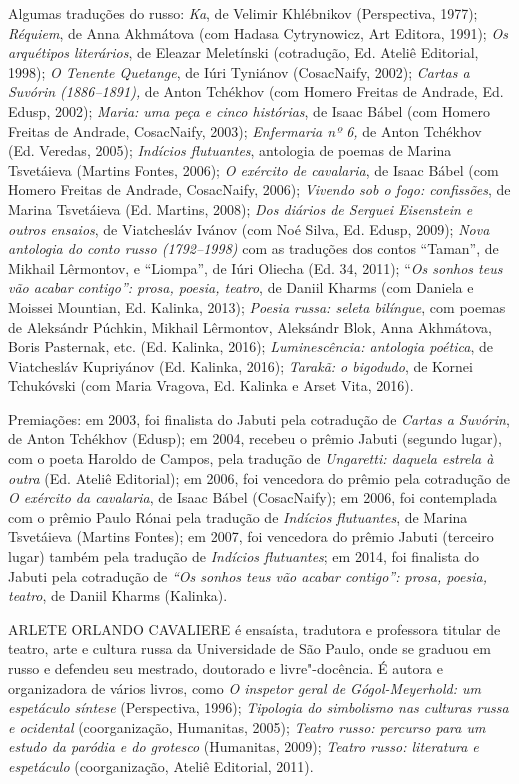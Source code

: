 Algumas traduções do russo: \emph{Ka}, de Velimir Khlébnikov
(Perspectiva, 1977); \emph{Réquiem}, de Anna Akhmátova (com Hadasa
Cytrynowicz, Art Editora, 1991); \emph{Os arquétipos literários}, de
Eleazar Meletínski (cotradução, Ed. Ateliê Editorial, 1998); \emph{O
Tenente Quetange}, de Iúri Tyniánov (CosacNaify, 2002); \emph{Cartas a
Suvórin (1886--1891),} de Anton Tchékhov (com Homero Freitas de Andrade,
Ed. Edusp, 2002); \emph{Maria: uma peça e cinco histórias}, de Isaac
Bábel (com Homero Freitas de Andrade, CosacNaify, 2003);
\emph{Enfermaria nº 6,} de Anton Tchékhov (Ed. Veredas, 2005);
\emph{Indícios flutuantes}, antologia de poemas de Marina Tsvetáieva
(Martins Fontes, 2006); \emph{O exército de cavalaria}, de Isaac Bábel
(com Homero Freitas de Andrade, CosacNaify, 2006); \emph{Vivendo sob o
fogo: confissões}, de Marina Tsvetáieva (Ed. Martins, 2008); \emph{Dos
diários de Serguei Eisenstein e outros ensaios}, de Viatchesláv Ivánov
(com Noé Silva, Ed. Edusp, 2009); \emph{Nova antologia do conto russo
(1792--1998)} com as traduções dos contos ``Taman'', de Mikhail
Lêrmontov, e ``Liompa'', de Iúri Oliecha (Ed. 34, 2011); ``\emph{Os
sonhos teus vão acabar contigo'': prosa, poesia, teatro}, de Daniil
Kharms (com Daniela e Moissei Mountian, Ed. Kalinka, 2013); \emph{Poesia
russa: seleta bilíngue}, com poemas de Aleksándr Púchkin, Mikhail
Lêrmontov, Aleksándr Blok, Anna Akhmátova, Boris Pasternak, etc. (Ed.
Kalinka, 2016); \emph{Luminescência: antologia poética}, de Viatchesláv
Kupriyánov (Ed. Kalinka, 2016); \emph{Tarakã: o bigodudo}, de Kornei
Tchukóvski (com Maria Vragova, Ed. Kalinka e Arset Vita, 2016).

Premiações: em 2003, foi finalista do Jabuti pela cotradução de
\emph{Cartas a Suvórin}, de Anton Tchékhov (Edusp); em 2004, recebeu o
prêmio Jabuti (segundo lugar), com o poeta Haroldo de Campos, pela
tradução de \emph{Ungaretti: daquela estrela à outra} (Ed. Ateliê
Editorial); em 2006, foi vencedora do prêmio \scalebox{0.8}{APCA} pela cotradução de
\emph{O exército da cavalaria}, de Isaac Bábel (CosacNaify); em 2006,
foi contemplada com o prêmio Paulo Rónai pela tradução de \emph{Indícios
flutuantes}, de Marina Tsvetáieva (Martins Fontes); em 2007, foi
vencedora do prêmio Jabuti (terceiro lugar) também pela tradução de
\emph{Indícios flutuantes}; em 2014, foi finalista do Jabuti pela
cotradução de \emph{``Os sonhos teus vão acabar contigo'': prosa,
poesia, teatro}, de Daniil Kharms (Kalinka).

\medskip

\noindent{}ARLETE ORLANDO CAVALIERE é ensaísta, tradutora e professora titular de teatro,
arte e cultura russa da Universidade de São Paulo, onde se graduou em
russo e defendeu seu mestrado, doutorado e livre"-docência. É autora e
organizadora de vários livros, como \emph{O inspetor geral de
Gógol-Meyerhold: um espetáculo síntese} (Perspectiva,
1996); \emph{Tipologia do simbolismo nas culturas russa e ocidental}
(coorganização, Humanitas, 2005); \emph{Teatro russo: percurso para um
estudo da paródia e do grotesco} (Humanitas, 2009); \emph{Teatro russo:
literatura e espetáculo} (coorganização, Ateliê Editorial, 2011).
 
